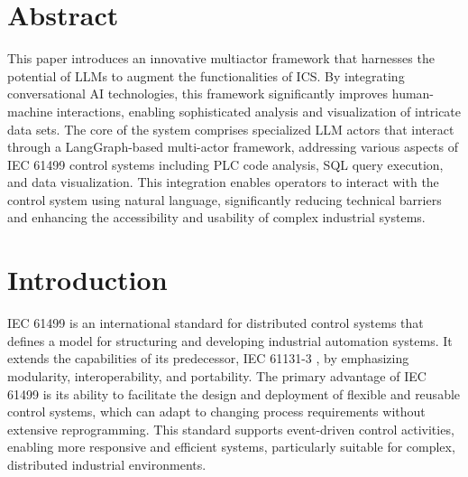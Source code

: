 \begin{bibunit}
\thispagestyle{plain}

\newcommand{\commentcolour}[3]{\textcolor{#3}{[\textbf{#1:} #2]}}
\newcommand{\commentVV}[1]{\commentcolour{VV}{#1}{orange}}
\newcommand{\VV}[1]{\textcolor{orange}{#1}}
\newcommand{\soutVV}[1]{\VV{\sout{#1}}}
\newcommand{\corrVV}[2]{\sout{#1} \VV{#2}}
\newcommand{\N}{{\mathbb N}}
\newcommand{\NN}{\mathcal N}
\newcommand{\etal}{\it et al. \normalfont}


\section*{Abstract}

This paper introduces an innovative multiactor framework that harnesses the potential of LLMs to augment the functionalities of ICS. By integrating conversational AI technologies, this framework significantly improves human-machine interactions, enabling sophisticated analysis and visualization of intricate data sets.  The core of the system comprises specialized LLM actors that interact through a LangGraph-based multi-actor framework, addressing various aspects of IEC 61499 control systems including PLC code analysis, SQL query execution, and data visualization. This integration enables operators to interact with the control system using natural language, significantly reducing technical barriers and enhancing the accessibility and usability of complex industrial systems. 
    
\section{Introduction}

IEC 61499 \cite{iec61499part12012} is an international standard for distributed control systems that defines a model for structuring and developing industrial automation systems. It extends the capabilities of its predecessor, IEC 61131-3 \cite{tiegelkamp2010iec}, by emphasizing modularity, interoperability, and portability. The primary advantage of IEC 61499 is its ability to facilitate the design and deployment of flexible and reusable control systems, which can adapt to changing process requirements without extensive reprogramming. This standard supports event-driven control activities, enabling more responsive and efficient systems, particularly suitable for complex, distributed industrial environments.


\end{bibunit}
